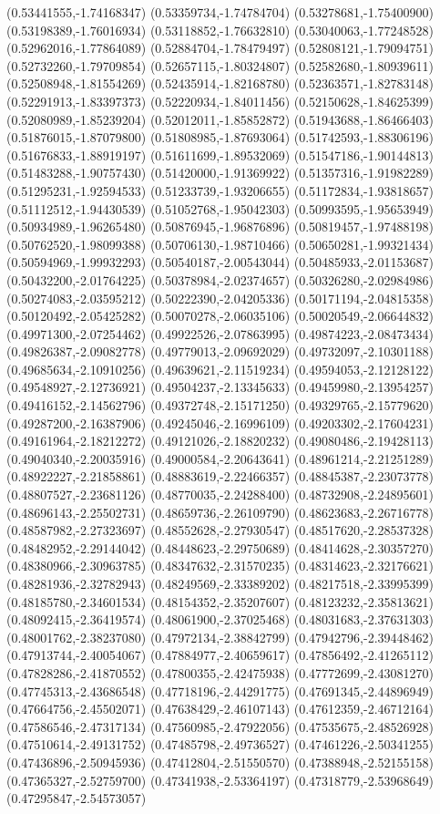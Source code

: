 (0.53441555,-1.74168347) (0.53359734,-1.74784704) (0.53278681,-1.75400900) (0.53198389,-1.76016934) (0.53118852,-1.76632810) (0.53040063,-1.77248528) (0.52962016,-1.77864089) (0.52884704,-1.78479497) (0.52808121,-1.79094751) (0.52732260,-1.79709854) (0.52657115,-1.80324807) (0.52582680,-1.80939611) (0.52508948,-1.81554269) (0.52435914,-1.82168780) (0.52363571,-1.82783148) (0.52291913,-1.83397373) (0.52220934,-1.84011456) (0.52150628,-1.84625399) (0.52080989,-1.85239204) (0.52012011,-1.85852872) (0.51943688,-1.86466403) (0.51876015,-1.87079800) (0.51808985,-1.87693064) (0.51742593,-1.88306196) (0.51676833,-1.88919197) (0.51611699,-1.89532069) (0.51547186,-1.90144813) (0.51483288,-1.90757430) (0.51420000,-1.91369922) (0.51357316,-1.91982289) (0.51295231,-1.92594533) (0.51233739,-1.93206655) (0.51172834,-1.93818657) (0.51112512,-1.94430539) (0.51052768,-1.95042303) (0.50993595,-1.95653949) (0.50934989,-1.96265480) (0.50876945,-1.96876896) (0.50819457,-1.97488198) (0.50762520,-1.98099388) (0.50706130,-1.98710466) (0.50650281,-1.99321434) (0.50594969,-1.99932293) (0.50540187,-2.00543044) (0.50485933,-2.01153687) (0.50432200,-2.01764225) (0.50378984,-2.02374657) (0.50326280,-2.02984986) (0.50274083,-2.03595212) (0.50222390,-2.04205336) (0.50171194,-2.04815358) (0.50120492,-2.05425282) (0.50070278,-2.06035106) (0.50020549,-2.06644832) (0.49971300,-2.07254462) (0.49922526,-2.07863995) (0.49874223,-2.08473434) (0.49826387,-2.09082778) (0.49779013,-2.09692029) (0.49732097,-2.10301188) (0.49685634,-2.10910256) (0.49639621,-2.11519234) (0.49594053,-2.12128122) (0.49548927,-2.12736921) (0.49504237,-2.13345633) (0.49459980,-2.13954257) (0.49416152,-2.14562796) (0.49372748,-2.15171250) (0.49329765,-2.15779620) (0.49287200,-2.16387906) (0.49245046,-2.16996109) (0.49203302,-2.17604231) (0.49161964,-2.18212272) (0.49121026,-2.18820232) (0.49080486,-2.19428113) (0.49040340,-2.20035916) (0.49000584,-2.20643641) (0.48961214,-2.21251289) (0.48922227,-2.21858861) (0.48883619,-2.22466357) (0.48845387,-2.23073778) (0.48807527,-2.23681126) (0.48770035,-2.24288400) (0.48732908,-2.24895601) (0.48696143,-2.25502731) (0.48659736,-2.26109790) (0.48623683,-2.26716778) (0.48587982,-2.27323697) (0.48552628,-2.27930547) (0.48517620,-2.28537328) (0.48482952,-2.29144042) (0.48448623,-2.29750689) (0.48414628,-2.30357270) (0.48380966,-2.30963785) (0.48347632,-2.31570235) (0.48314623,-2.32176621) (0.48281936,-2.32782943) (0.48249569,-2.33389202) (0.48217518,-2.33995399) (0.48185780,-2.34601534) (0.48154352,-2.35207607) (0.48123232,-2.35813621) (0.48092415,-2.36419574) (0.48061900,-2.37025468) (0.48031683,-2.37631303) (0.48001762,-2.38237080) (0.47972134,-2.38842799) (0.47942796,-2.39448462) (0.47913744,-2.40054067) (0.47884977,-2.40659617) (0.47856492,-2.41265112) (0.47828286,-2.41870552) (0.47800355,-2.42475938) (0.47772699,-2.43081270) (0.47745313,-2.43686548) (0.47718196,-2.44291775) (0.47691345,-2.44896949) (0.47664756,-2.45502071) (0.47638429,-2.46107143) (0.47612359,-2.46712164) (0.47586546,-2.47317134) (0.47560985,-2.47922056) (0.47535675,-2.48526928) (0.47510614,-2.49131752) (0.47485798,-2.49736527) (0.47461226,-2.50341255) (0.47436896,-2.50945936) (0.47412804,-2.51550570) (0.47388948,-2.52155158) (0.47365327,-2.52759700) (0.47341938,-2.53364197) (0.47318779,-2.53968649) (0.47295847,-2.54573057) 